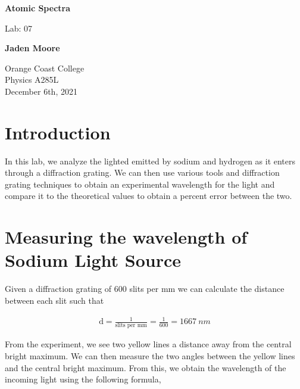 \documentclass[12pt]{article}
\begin{document}

\begin{titlepage}
    \begin{center}
        \vspace*{1cm}
        \textbf{Atomic Spectra}

        \vspace{0.5cm}
        Lab: 07

        \vspace{1cm}

        \textbf{Jaden Moore}

        \vfill

        Orange Coast College\\
        Physics A285L\\
        December 6th, 2021

    \end{center}
\end{titlepage}

\pagestyle{fancy}
\fancyhf{}
\setlength{\headheight}{15pt}
\cfoot{\thepage}

\section{Introduction}
In this lab, we analyze the lighted emitted by sodium and hydrogen as it enters through a diffraction grating. We can then use various tools and diffraction grating techniques to obtain an experimental wavelength for the light and compare it to the theoretical values to obtain a percent error between the two.

\section{Measuring the wavelength of Sodium Light Source}
Given a diffraction grating of 600 slits per mm we can calculate the distance between each slit such that

\begin{equation}
    \begin{split}
        \text{d} = \frac{1}{\text{slits per mm}} = \frac{1}{600} = \SI{1667}{nm}
    \end{split}
\end{equation}

From the experiment, we see two yellow lines a distance away from the central bright maximum. We can then measure the two angles between the yellow lines and the central bright maximum. From this, we obtain the wavelength of the incoming light using the following formula,
\end{document}
